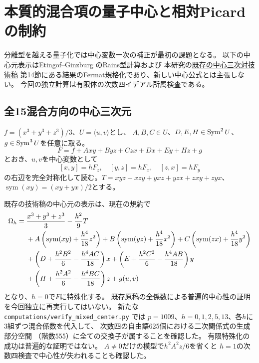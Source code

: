 \section{本質的混合項の量子中心と相対Picardの制約}
\label{sec:mixed-quantum-center}
分離型を越える量子化では中心変数一次の補正が最初の課題となる。
以下の中心元表示はEtingof--Ginzburg \cite[\S9]{EG} のRains型計算および
本研究の\href{https://github.com/uedakazushi/nc-cubic2/blob/main/papers/pdf-only/ambient/central_pair_formal_moduli.pdf}{既存の中心三次対技術稿}
第14節にある結果のFermat規格化であり、新しい中心公式とは主張しない。
今回の独立計算は有限体の次数四イデアル所属検査である。

\subsection{全15混合方向の中心三次元}
$f=(x^3+y^3+z^3)/3$、$U=\langle u,v\rangle$とし、
$A,B,C\in U$、$D,E,H\in\operatorname{Sym}^2U$、$g\in\operatorname{Sym}^3U$を任意に取る。
\begin{equation}\label{eq:full-mixed-fermat}
 F=f+Axy+Byz+Czx+Dx+Ey+Hz+g
\end{equation}
とおき、$u,v$を中心変数として
\begin{equation}\label{eq:full-mixed-brackets}
 [x,y]=hF_z,\quad[y,z]=hF_x,\quad[z,x]=hF_y
\end{equation}
の右辺を完全対称化して読む。$T=xyz+xzy+yxz+yzx+zxy+zyx$、
$\operatorname{sym}(xy)=(xy+yx)/2$とする。

\begin{remark}[既存原稿の全混合中心元と検算状態]\label{rem:full-mixed-center}
既存の技術稿の中心元の表示は、現在の規約で
\begin{align}\label{eq:full-mixed-center}
\Omega_h={}&\frac{x^3+y^3+z^3}{3}-\frac{h^2}{9}T\notag\\
&+A\left(\operatorname{sym}(xy)+\frac{h^4}{18}z^2\right)
 +B\left(\operatorname{sym}(yz)+\frac{h^4}{18}x^2\right)
 +C\left(\operatorname{sym}(zx)+\frac{h^4}{18}y^2\right)\notag\\
&+\left(D+\frac{h^2B^2}{6}-\frac{h^4AC}{18}\right)x
 +\left(E+\frac{h^2C^2}{6}-\frac{h^4AB}{18}\right)y\notag\\
&+\left(H+\frac{h^2A^2}{6}-\frac{h^4BC}{18}\right)z+g(u,v)
\end{align}
となり、$h=0$で$F$に特殊化する。
既存原稿の全係数による普遍的中心性の証明を今回独立に再実行してはいない。
新たな \texttt{computations/verify\_mixed\_center.py} では
$p=1009$、$h=0,1,2,5,13$、各$h$に3組ずつ混合係数を代入して、
次数四の自由語625個における二次関係式の生成部分空間
（階数555）に全ての交換子が属することを確認した。
有限特殊化の成功は普遍的な証明ではない。
$A\ne0$だけの模型で$h^2A^2z/6$を省くと
$h=1$の次数四検査で中心性が失われることも確認した。
\end{remark}

